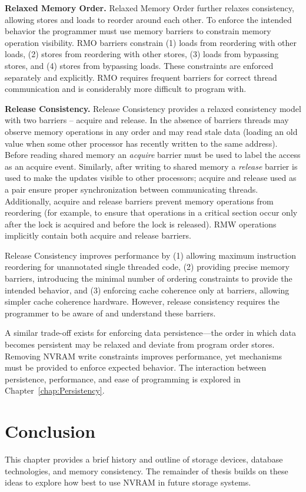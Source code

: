 \textbf{Relaxed Memory Order.}
Relaxed Memory Order \cite{SPARCv9} further relaxes consistency, allowing stores and loads to reorder around each other.
To enforce the intended behavior the programmer must use memory barriers to constrain memory operation visibility.
RMO barriers constrain (1) loads from reordering with other loads, (2) stores from reordering with other stores, (3) loads from bypassing stores, and (4) stores from bypassing loads.
These constraints are enforced separately and explicitly.
RMO requires frequent barriers for correct thread communication and is considerably more difficult to program with.

\textbf{Release Consistency.}
Release Consistency \cite{GharachorlooLenoski90} provides a relaxed consistency model with two barriers -- acquire and release.
In the absence of barriers threads may observe memory operations in any order and may read stale data (loading an old value when some other processor has recently written to the same address).
Before reading shared memory an \emph{acquire} barrier must be used to label the access as an acquire event.
Similarly, after writing to shared memory a \emph{release} barrier is used to make the updates visible to other processors; acquire and release used as a pair ensure proper synchronization between communicating threads.
Additionally, acquire and release barriers prevent memory operations from reordering (for example, to ensure that operations in a critical section occur only after the lock is acquired and before the lock is released).
RMW operations implicitly contain both acquire and release barriers.

Release Consistency improves performance by (1) allowing maximum instruction reordering for unannotated single threaded code, (2) providing precise memory barriers, introducing the minimal number of ordering constraints to provide the intended behavior, and (3) enforcing cache coherence only at barriers, allowing simpler cache coherence hardware.
However, release consistency requires the programmer to be aware of and understand these barriers.

A similar trade-off exists for enforcing data persistence---the order in which data becomes persistent may be relaxed and deviate from program order stores.
Removing NVRAM write constraints improves performance, yet mechanisms must be provided to enforce expected behavior.
The interaction between persistence, performance, and ease of programming is explored in Chapter~\ref{chap:Persistency}.

\section{Conclusion}
\label{sec:Background:Conclusion}

This chapter provides a brief history and outline of storage devices, database technologies, and memory consistency.
The remainder of thesis builds on these ideas to explore how best to use NVRAM in future storage systems.
